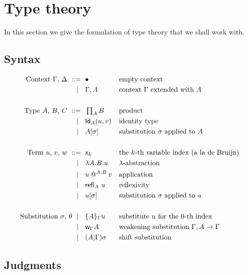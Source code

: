 \section{Type theory}
\label{sec:type-theory}

In this section we give the formulation of type theory that we shall work with.

\subsection{Syntax}
\label{sec:syntax}

\begin{align*}
  \text{Context $\Gamma$, $\Delta$}
    \ \mathrel{{:}{:}{=}}\    {}& \bullet                && \text{empty context} \\
    \ \mid\ \  {}& \Gamma, A       && \text{context $\Gamma$ extended with $A$} \\
  \\
  \text{Type $A$, $B$, $C$}
    \ \mathrel{{:}{:}{=}}\    {}& \mathop{\textstyle\prod_{A}} B             && \text{product}\\
    \ \mid\ \  {}& \mathsf{Id}_{A}(u,v)        && \text{identity type} \\
    \ \mid\ \  {}& A[\sigma]         && \text{substitution $\sigma$ applied to $A$} \\
  \\
  \text{Term $u$, $v$, $w$}
    \ \mathrel{{:}{:}{=}}\    {}& \mathsf{x}_{k}                  && \text{the $k$-th variable index (a la de Bruijn)} \\
    \ \mid\ \  {}& \lambda A . B . u         && \text{$\lambda$-abstraction} \\
    \ \mid\ \  {}& u\mathbin{@^{A.B}} v   && \text{application} \\
    \ \mid\ \  {}& {\mathsf{refl}_{A}}\  u            && \text{reflexivity} \\
    \ \mid\ \  {}& u[\sigma]        && \text{substitution $\sigma$ applied to $u$} \\
  \\
  \text{Substitution $\sigma$, $\theta$}
    \ \mid\ \  {}& \{A\}_{\Gamma}{u}     && \text{substitute $u$ for the $0$-th index} \\
    \ \mid\ \  {}& \mathsf{w}_{\Gamma}{A}          && \text{weakening substitution $\Gamma, A \to \Gamma$} \\
    \ \mid\ \  {}& (A {\mid} \Gamma){\sigma}   && \text{shift substitution}
\end{align*}

\subsection{Judgments}
\label{sec:judgments}

